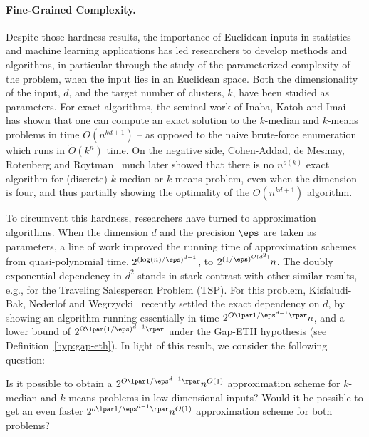 \paragraph*{Fine-Grained Complexity.}
Despite those hardness results, the importance of Euclidean inputs in statistics and
machine learning applications 
has led researchers to develop methods and algorithms, in particular through the study of the parameterized complexity of the problem, when the input lies in an Euclidean space. 
Both the dimensionality of the input, $d$, and the target number of clusters, $k$, have been studied as parameters. 
For exact algorithms, the seminal work of Inaba, Katoh and Imai~\cite{InabaKI94} has shown that one can compute an exact solution to the $k$-median and $k$-means problems in time $O(n^{kd+1})$ -- as opposed to the  naive brute-force enumeration which runs in $\tilde{O}(k^n)$ time.
On the negative side, Cohen-Addad, de Mesmay, Rotenberg and Roytman~\cite{CohenaddadSODA18} much later showed that there is no $n^{o(k)}$ exact algorithm for (discrete) $k$-median or $k$-means problem, even when
the dimension is four, and thus partially showing the optimality of the $O(n^{kd + 1})$ algorithm.

To circumvent this hardness, researchers have turned to approximation algorithms. When the dimension $d$ and the precision $\eps$ are taken as parameters, a line of work \cite{AroraRR98, KolliopoulosR07, FriggstadRS19, Cohen-AddadKM19, Cohen-Addad18, jacm} improved the running time of approximation schemes from quasi-polynomial time, $2^{(\log(n)/\eps)^{d-1}}$, to  $2^{(1/\eps)^{O(d^2)}} n$. 
The doubly exponential dependency in $d^2$ stands in stark contrast with other similar results, e.g., for the Traveling Salesperson Problem (TSP). 
For this problem, Kisfaludi-Bak, Nederlof and Wegrzycki~\cite{Kisfaludi-BakNW21} recently settled the exact dependency on $d$, by showing an algorithm running essentially in time $2^{O\lpar 1/\eps^{d-1}\rpar} n$, and a lower bound of $2^{\Omega\lpar (1/\eps)^{d-1}\rpar}$ under the Gap-ETH hypothesis \cite{D16,MR16} (see Definition~\ref{hyp:gap-eth}). 
In light of this result, we consider the following question:


\begin{question}\label{q:approx}
Is it possible to obtain a $2^{O\lpar 1/\eps^{d-1}\rpar} n^{O(1)}$ approximation scheme for $k$-median and $k$-means problems in low-dimensional inputs? Would it be possible to get an even faster $2^{o\lpar 1/\eps^{d-1}\rpar} n^{O(1)}$ approximation scheme for both problems?
\end{question}



